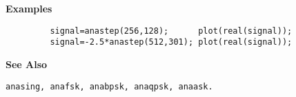 {\bf \large \sf Examples}
\begin{verbatim}
         signal=anastep(256,128);      plot(real(signal));
         signal=-2.5*anastep(512,301); plot(real(signal));
\end{verbatim}
\vspace*{.5cm}


{\bf \large \sf See Also}\\
\hspace*{1.5cm}
\begin{minipage}[t]{13.5cm}
\begin{verbatim}
anasing, anafsk, anabpsk, anaqpsk, anaask.
\end{verbatim}
\end{minipage}




